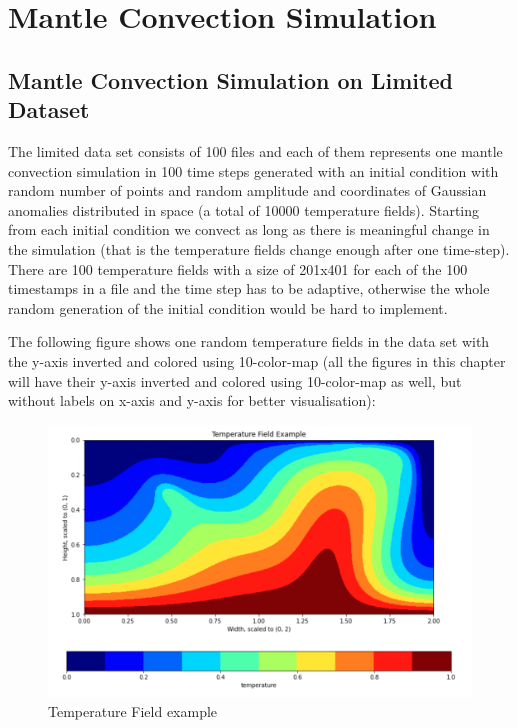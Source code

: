 \chapter{Mantle Convection Simulation}\label{chap:evaluation}

\section{Mantle Convection Simulation on Limited Dataset}

The limited data set consists of 100 files and each of them represents one mantle convection simulation in 100 time steps generated with an initial condition with random number of points and random amplitude and coordinates of Gaussian anomalies distributed in space (a total of 10000 temperature fields). Starting from each initial condition we convect as long as there is meaningful change in the simulation (that is the temperature fields change enough after one time-step). There are 100 temperature fields with a size of 201x401 for each of the 100 timestamps in a file and the time step has to be adaptive, otherwise the whole random generation of the initial condition would be hard to implement.

The following figure shows one random temperature fields in the data set with the y-axis inverted and colored using 10-color-map (all the figures in this chapter will have their y-axis inverted and colored using 10-color-map as well, but without labels on x-axis and y-axis for better visualisation):

\begin{figure}[H]
    \caption{Temperature Field example}
    \includegraphics[scale=0.6]{figures/mantle_convection_images/temperature_field_example.png}
\end{figure}

